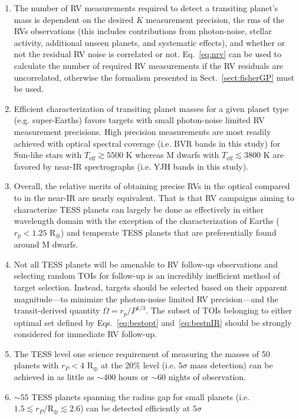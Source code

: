 \begin{enumerate}
\item The number of RV measurements required to detect a transiting planet's mass is dependent on
  the desired $K$ measurement precision, the rms of the RVs observations (this includes contributions
  from photon-noise, stellar activity, additional unseen planets, and systematic effects),
  and whether or not the residual RV noise is correlated or not.
  Eq.~\ref{eq:nrv} can be used to calculate the number of required RV measurements
  if the RV residuals are uncorrelated,
  otherwise the formalism presented in Sect.~\ref{sect:fisherGP} must be used.
\item Efficient characterization of transiting planet masses for a given planet type (e.g. super-Earths)
  favors targets with small photon-noise limited RV measurement precisions. High precision measurements
  are most readily achieved with optical spectral coverage (i.e. BVR bands in this study)
  for Sun-like stars with $T_{\text{eff}} \gtrsim 5500$ K whereas  M dwarfs with
  $T_{\text{eff}} \lesssim 3800$ K are favored by near-IR spectrographs (i.e. YJH bands in this study).
\item Overall, the relative merits of obtaining precise RVs in the optical compared to in the near-IR are    
  nearly equivalent. That is that RV campaigns aiming to characterize TESS planets can largely be done as
  effectively in either wavelength domain with the exception of the characterization of Earths 
  ($r_p < 1.25$ R$_{\oplus}$) and temperate TESS planets that are preferentially found around M dwarfs.
\item Not all TESS planets will be amenable to RV follow-up observations and selecting random TOIs
  for follow-up is an incredibly inefficient method of target selection. Instead, targets should be
  selected based on their apparent magnitude---to minimize the photon-noise limited RV precision---and
  the transit-derived quantity $\Omega = r_p / P^{1/3}$. The subset of TOIs belonging to either optimal set defined
  by Eqs.~\ref{eq:bestopt} and~\ref{eq:bestnIR} should be strongly considered for immediate RV follow-up.
\item The TESS level one science requirement of measuring the masses of 50 planets with
  $r_P<4$ R$_{\oplus}$ at the 20\% level (i.e. $5\sigma$ mass detection) can be achieved in as little
  as $\sim 400$ hours or $\sim 60$ nights of observation.
\item $\sim 55$ TESS planets spanning the radius gap for small planets
  (i.e. $1.5 \lesssim r_P/\text{R}_{\oplus} \lesssim 2.6$) can be detected efficiently at $5\sigma$

\end{enumerate}
